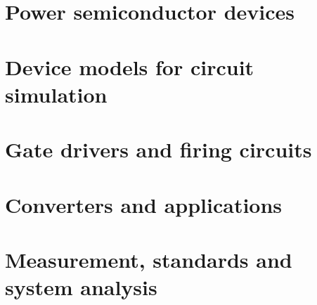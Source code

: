 \documentclass[11pt,a4paper,oneside]{book}
\begin{document}
\frontmatter

\tableofcontents

\mainmatter

\part{Power semiconductor devices}





\part{Device models for circuit simulation}


\part{Gate drivers and firing circuits}


\part{Converters and applications}






\part{Measurement, standards and system analysis}



\backmatter

\end{document}
